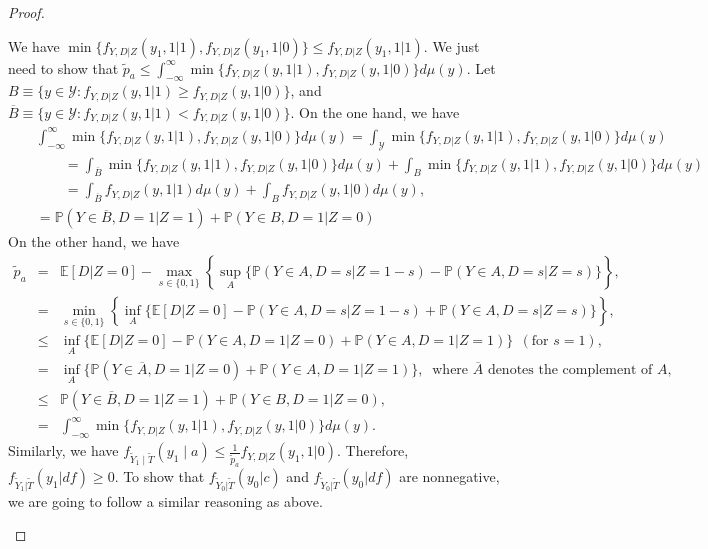 \documentclass[12pt]{article}
\theoremstyle{plain}
\theoremstyle{definition}
\theoremstyle{remark}
\begin{document}
\begin{proof}
\begin{enumerate}
We have $\min\{f_{Y,D\vert Z}(y_1,1\vert 1),f_{Y,D\vert Z}(y_1,1\vert 0)\} \leq f_{Y,D\vert Z}(y_1,1\vert 1)$. We just need to show that $\tilde{p}_a \leq \int^{\infty}_{-\infty}\min\{f_{Y,D\vert Z}(y,1\vert 1),f_{Y,D\vert Z}(y,1\vert 0)\}d\mu(y)$. Let $B\equiv \{y\in \mathcal Y: f_{Y,D\vert Z}(y,1\vert 1) \geq f_{Y,D\vert Z}(y,1\vert 0)\}$, and $\overline{B}\equiv \{y\in \mathcal Y: f_{Y,D\vert Z}(y,1\vert 1) < f_{Y,D\vert Z}(y,1\vert 0)\}$. On the one hand, we have
\begin{eqnarray*}
&& \int^{\infty}_{-\infty}\min\{f_{Y,D\vert Z}(y,1\vert 1),f_{Y,D\vert Z}(y,1\vert 0)\}d\mu(y)=\int_{\mathcal Y}\min\{f_{Y,D\vert Z}(y,1\vert 1),f_{Y,D\vert Z}(y,1\vert 0)\}d\mu(y)\\
&& \qquad = \int_{\overline{B}}\min\{f_{Y,D\vert Z}(y,1\vert 1),f_{Y,D\vert Z}(y,1\vert 0)\}d\mu(y) + \int_{B}\min\{f_{Y,D\vert Z}(y,1\vert 1),f_{Y,D\vert Z}(y,1\vert 0)\}d\mu(y)\\
&& \qquad = \int_{\overline{B}}f_{Y,D\vert Z}(y,1\vert 1)d\mu(y) + \int_{B}f_{Y,D\vert Z}(y,1\vert 0)d\mu(y),\\
&& =\mathbb{P}(Y \in \overline{B}, D=1  \vert  Z=1)+\mathbb{P}(Y \in B, D=1  \vert  Z=0)
\end{eqnarray*}
On the other hand, we have 
\begin{eqnarray*}
    \tilde{p}_a &=& \mathbb E[D \vert Z=0]-\max_{s \in\{0,1\}}\left\{\sup _A\{\mathbb{P}(Y \in A, D=s  \vert  Z=1-s)-\mathbb{P}(Y \in A, D=s  \vert  Z=s)\}\right\},\\
    &=& \min_{s \in\{0,1\}}\left\{\inf_A\{\mathbb E[D \vert Z=0]-\mathbb{P}(Y \in A, D=s  \vert  Z=1-s)+\mathbb{P}(Y \in A, D=s  \vert  Z=s)\}\right\},\\
    &\leq& \inf_A\{\mathbb E[D \vert Z=0]-\mathbb{P}(Y \in A, D=1  \vert  Z=0)+\mathbb{P}(Y \in A, D=1  \vert  Z=1)\} \ \ (\text{for } s=1),\\
    &=& \inf_A\{\mathbb{P}(Y \in \overline{A}, D=1  \vert  Z=0)+\mathbb{P}(Y \in A, D=1  \vert  Z=1)\},\ \text{ where } \overline{A} \text{ denotes the complement of } A, \\
    &\leq& \mathbb{P}(Y \in \overline{B}, D=1  \vert  Z=1)+\mathbb{P}(Y \in B, D=1  \vert  Z=0),\\
    &=&  \int^{\infty}_{-\infty}\min\{f_{Y,D\vert Z}(y,1\vert 1),f_{Y,D\vert Z}(y,1\vert 0)\}d\mu(y).    
\end{eqnarray*}
Similarly, we have $f_{\tilde{Y}_1 \mid \tilde{T}}(y_1\mid a) \leq \frac{1}{\tilde{p}_a}f_{Y, D \vert Z}(y_1,1\vert 0)$. Therefore, $f_{\tilde{Y}_1 \vert \tilde{T}}(y_1 \vert df) \geq 0$. To show that $f_{\tilde{Y}_0 \vert \tilde{T}}(y_0 \vert c)$ and $f_{\tilde{Y}_0 \vert \tilde{T}}(y_0 \vert df)$ are nonnegative, we are going to follow a similar reasoning as above. 


\end{enumerate}
\end{proof}
\end{document}
